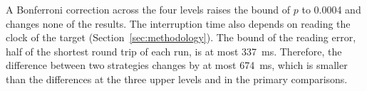 A Bonferroni correction across the four levels raises the bound of $p$ to 0.0004 and changes none of the results. The interruption time also depends on reading the clock of the target (Section~\ref{sec:methodology}). The bound of the reading error, half of the shortest round trip of each run, is at most \SI{337}{\milli\second}. Therefore, the difference between two strategies changes by at most \SI{674}{\milli\second}, which is smaller than the differences at the three upper levels and in the primary comparisons.

